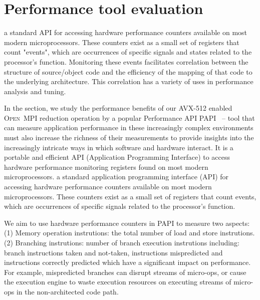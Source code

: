 \documentclass[sigconf]{acmart}
\newcommand{\ompi}[0]{\textsc{Open~MPI}\xspace}
\begin{document}
\section{Performance tool evaluation}\label{sec:perf}
a standard API for accessing hardware
performance counters available on most modern microprocessors. These counters exist
as a small set of registers that count "events", which are occurrences of specific signals
and states related to the processor's function. Monitoring these events facilitates
correlation between the structure of source/object code and the efficiency of the mapping
of that code to the underlying architecture. This correlation has a variety of uses in
performance analysis and tuning.

In the section, we study the performance benefits of our AVX-512 enabled \ompi reduction
operation by a popular Performance API PAPI~\cite{papi} -- tool that can measure
application performance in these increasingly complex environments must also
increase the richness of their measurements to provide insights into the
increasingly intricate ways in which software and hardware interact.
It is a portable and efficient API (Application Programming Interface) to access hardware performance
monitoring registers found on most modern microprocessors.
a standard application programming interface (API) for accessing
hardware performance counters available on most modern microprocessors. These counters exist as a small set of
registers that count events, which are occurrences of specific signals related to the processor’s function.

We aim to use hardware performance counters in PAPI to measure two aspects:
(1) Memory operation instrutions: the total number of load and store instrutions.
(2) Branching instrutions: number of branch execution instrutions including: branch instructions taken and not-taken,
instructions mispredicted and instructions correctly predicted which have a significant impact on performance.
For example, mispredicted branches can disrupt streams of micro-ops, or cause
the execution engine to waste execution resources on executing
streams of micro-ops in the non-architected code path.
\end{document}
